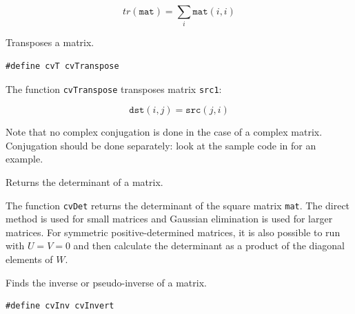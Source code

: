 \[ tr(\texttt{mat}) = \sum_i \texttt{mat}(i,i) \]

\label{Transpose}

Transposes a matrix.


\begin{lstlisting}
#define cvT cvTranspose
\end{lstlisting}

\begin{description}
\end{description}

The function \texttt{cvTranspose} transposes matrix \texttt{src1}:

\[ \texttt{dst}(i,j) = \texttt{src}(j,i) \]

Note that no complex conjugation is done in the case of a complex
matrix. Conjugation should be done separately: look at the sample code
in  for an example.

\label{Det}

Returns the determinant of a matrix.


\begin{description}
\end{description}

The function \texttt{cvDet} returns the determinant of the square matrix \texttt{mat}. The direct method is used for small matrices and Gaussian elimination is used for larger matrices. For symmetric positive-determined matrices, it is also possible to run
with $U = V = 0$ and then calculate the determinant as a product of the diagonal elements of $W$.

\label{Invert}

Finds the inverse or pseudo-inverse of a matrix.

\begin{lstlisting}
#define cvInv cvInvert
\end{lstlisting}


